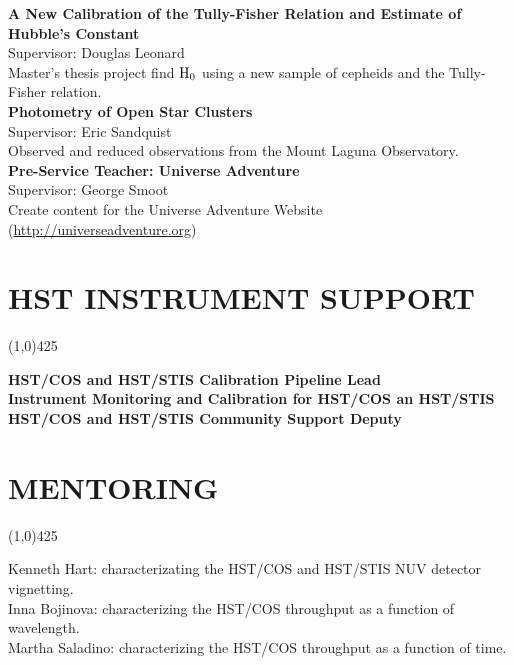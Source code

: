 \documentclass{res}
\begin{document}
\begin{resume}
{\bf  A New Calibration of the Tully-Fisher Relation and Estimate of Hubble's Constant} \\ %
\hspace*{24pt}Supervisor: Douglas Leonard\\
\hspace*{24pt}Master's thesis project find $\rm{H_0}$ using a new sample of cepheids and the Tully-Fisher relation.   \\
{\bf Photometry of Open Star Clusters } \hspace{87pt}\\
\hspace*{24pt}Supervisor: Eric Sandquist\\
\hspace*{24pt}Observed and reduced observations from the Mount Laguna Observatory. \\ 
{\bf Pre-Service Teacher: Universe Adventure} \hspace{56pt}\\
\hspace*{24pt}Supervisor: George Smoot \\
\hspace*{24pt}Create content for the Universe Adventure Website ({\color{blue}\url{http://universeadventure.org}}) \\
\section{HST INSTRUMENT SUPPORT} 
\vspace{-.2in}
\begin{center}
\line(1,0){425}
\end{center}
\vspace{-.3in}
\vspace{0.1in}

{\bf HST/COS and HST/STIS Calibration Pipeline Lead} \\
{\bf Instrument Monitoring and Calibration for HST/COS an HST/STIS} \\
{\bf HST/COS and HST/STIS Community Support Deputy} \\
\section{MENTORING} 
\vspace{-.2in}
\begin{center}
\line(1,0){425}
\end{center}
\vspace{-.3in}
\vspace{0.1in}
Kenneth Hart: characterizating the HST/COS and HST/STIS NUV detector vignetting. \\
Inna Bojinova: characterizing the HST/COS throughput as a function of wavelength. \\
Martha Saladino: characterizing the HST/COS throughput as a function of time. \\


\end{resume}
\end{document}
